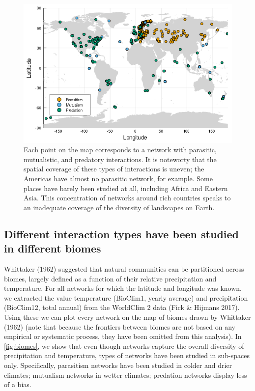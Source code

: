\begin{figure}
\hypertarget{fig:spatial}{%
\centering
\includegraphics{figures/figure_01_c.png}
\caption{Each point on the map corresponds to a network with parasitic,
mutualistic, and predatory interactions. It is noteworty that the
spatial coverage of these types of interactions is uneven; the Americas
have almost no parasitic network, for example. Some places have barely
been studied at all, including Africa and Eastern Asia. This
concentration of networks around rich countries speaks to an inadequate
coverage of the diversity of landscapes on Earth.}\label{fig:spatial}
}
\end{figure}

\hypertarget{different-interaction-types-have-been-studied-in-different-biomes}{%
\subsection{Different interaction types have been studied in different
biomes}\label{different-interaction-types-have-been-studied-in-different-biomes}}

Whittaker (1962) suggested that natural communities can be partitioned
across biomes, largely defined as a function of their relative
precipitation and temperature. For all networks for which the latitude
and longitude was known, we extracted the value temperature (BioClim1,
yearly average) and precipitation (BioClim12, total annual) from the
WorldClim 2 data (Fick \& Hijmans 2017). Using these we can plot every
network on the map of biomes drawn by Whittaker (1962) (note that
because the frontiers between biomes are not based on any empirical or
systematic process, they have been omitted from this analysis). In
\cref{fig:biomes}, we show that even though networks capture the overall
diversity of precipitation and temperature, types of networks have been
studied in sub-spaces only. Specifically, parasitism networks have been
studied in colder and drier climates; mutualism networks in wetter
climates; predation networks display less of a bias.

